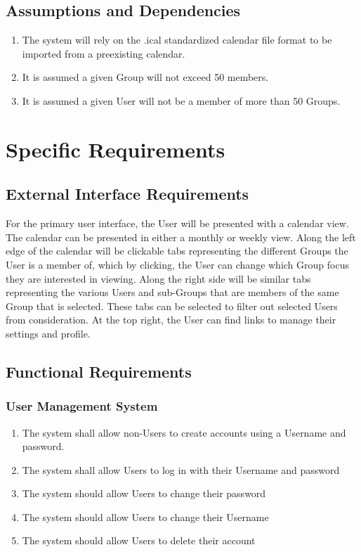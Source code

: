 \documentclass{scrreprt}
\begin{document}
\section{Assumptions and Dependencies}
\begin{enumerate}
\item The system will rely on the .ical standardized calendar file format to
be imported from a preexisting calendar.
\item It is assumed a given Group will not exceed 50 members.
\item It is assumed a given User will not be a member of more than 50 Groups.
\end{enumerate}


\chapter{Specific Requirements}

\section{External Interface Requirements}
For the primary user interface, the User will be presented with a calendar view.
The calendar can be presented in either a monthly or weekly view. Along the left
edge of the calendar will be clickable tabs representing the different Groups
the User is a member of, which by clicking, the User can change which Group
focus they are interested in viewing. Along the right side will be similar tabs
representing the various Users and sub-Groups that are members of the same
Group that is selected. These tabs can be selected to filter out selected Users
from consideration. At the top right, the User can find links to manage their
settings and profile.
\section{Functional Requirements}

\subsection{User Management System}
    \begin{enumerate}
    \item The system shall allow non-Users to create accounts using a Username and password.
    \item The system shall allow Users to log in with their Username and password
    \item The system should allow Users to change their password
    \item The system should allow Users to change their Username
    \item The system should allow Users to delete their account
    \end{enumerate}
\end{document}
